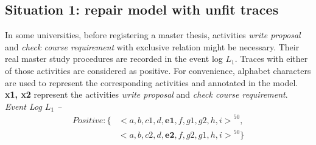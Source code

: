 \subsection{Situation 1: \small{repair model with unfit traces}} %
In some universities, before registering a master thesis, activities \emph{write proposal} and \emph{check course requirement} with exclusive relation might be necessary. Their real master study procedures are recorded in the event log $L_1$. Traces with either of those activities are considered as positive. For convenience, alphabet characters are used to represent the corresponding activities and annotated in the model. \textbf{x1, x2} represent the activities \emph{write proposal} and \emph{check course requirement}.
\emph{Event Log $L_1$ -- }
		\begin{align*}
		Positive:\{ & { <a,b, c1,d,\textbf{e1},f,g1,g2,h,i>}^{50}, \\   &{<a,b, c2,d,\textbf{e2},f,g2,g1,h,i>}^{50} \}
		\end{align*}
